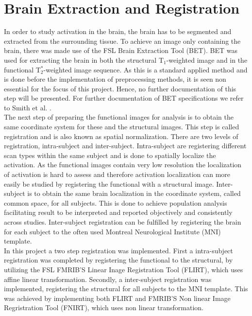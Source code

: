 \section{Brain Extraction and Registration} \label{BET}

In order to study activation in the brain, the brain has to be segmented and extracted from the surrounding tissue. To achieve an image only containing the brain, there was made use of the FSL Brain Extraction Tool (BET).  BET was used for extracting the brain in both the structural T$_1$-weighted image and in the functional T$_{2}^*$-weighted image sequence. As this is a standard applied method and is done before the implementation of preprocessing methods, it is seen non essential for the focus of this project. Hence, no further documentation of this step will be presented. For further documentation of BET specifications we refer to Smith et al. \cite{Smith2002}.    \\
The next step of preparing the functional images for analysis is to obtain the same coordinate system for these and the structural images. This step is called registration and is also known as spatial normalization. There are two levels of registration, intra-subject and inter-subject. Intra-subject are registering different scan types within the same subject and is done to spatially localize the activation. As the functional images contain very low resolution the localization of activation is hard to assess and therefore activation localization can more easily be studied by registering the functional with a structural image. Inter-subject is to obtain the same brain localization in the coordinate system, called common space, for all subjects. This is done to achieve population analysis facilitating result to be interpreted and reported objectively and consistently across studies. Inter-subject registration can be fulfilled by registering the brain for each subject to the often used Montreal Neurological Institute (MNI) template. \cite{Hajnal2001} \\
In this project a two step registration was implemented. First a intra-subject registration was completed by registering the functional to the structural, by utilizing the FSL FMRIB'S Linear Inage Registration Tool (FLIRT), which uses affine linear transformation. \cite{Jenkinson2001} Secondly, a inter-subject registration was implemented, registering the structural for all subjects to the MNI template. This was achieved by implementing both FLIRT and FMRIB'S Non linear Image Regristration Tool (FNIRT), which uses non linear transformation. \cite{Andersson2007}   

